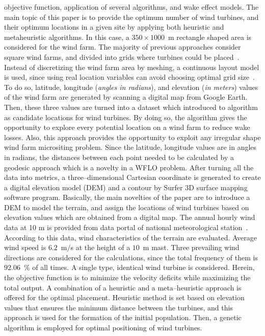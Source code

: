 \documentclass[]{iptconf}
\begin{document}
objective function, application of several algorithms, and wake effect models.
The main topic of this paper is to provide the optimum number of wind turbines,
and their optimum locations in a given site by applying both heuristic and 
metaheuristic algorithms. In this case, a $350\times1000$~m rectangle shaped area is considered
for the wind farm. The majority of previous approaches consider square wind farms,
and divided into grids where turbines could be placed~\cite{Saavedra2011}. Instead of discretizing
the wind farm area by meshing, a continuous layout model is used, since using
real location variables can avoid choosing optimal grid size~\cite{Gu2013}. To do so, latitude,
longitude (\textit{angles in radians}), and elevation (\textit{in meters}) values of the wind farm are
generated by scanning a digital map from Google Earth. Then, these three values are
turned into a dataset which introduced to algorithm as candidate locations for wind
turbines. By doing so, the algorithm gives the opportunity to explore every potential
location on a wind farm to reduce wake losses. Also, this approach provides the
opportunity to exploit any irregular shape wind farm micrositing problem. Since the
latitude, longitude values are in angles in radians, the distances between each point
needed to be calculated by a geodesic approach which is a novelty in a WFLO
problem. After turning all the data into metrics, a three--dimensional Cartesian
coordinate is generated to create a digital elevation model (DEM) and a contour
by Surfer $3$D surface mapping software program. Basically, the main novelties of
the paper are to introduce a DEM to model the terrain, and assign the locations of
wind turbines based on elevation values which are obtained from a digital map.
The annual hourly wind data at 10 m is provided from data portal of national
meteorological station~\cite{Meteoroloji2016}. According to this data, wind characteristics of the
terrain are evaluated. Average wind speed is $6.2$~m$/$s at the height of a $10$~m mast.
Three prevailing wind directions are considered for the calculations, since the total
frequency of them is $92.06$~\% of all times. A single type, identical wind turbine is
considered. Herein, the objective function is to minimize the velocity deficits while
maximizing the total output. A combination of a heuristic and a meta--heuristic
approach is offered for the optimal placement. Heuristic method is set based on
elevation values that ensures the minimum distance between the turbines, and
this approach is used for the formation of the initial population. Then, a genetic
algorithm is employed for optimal positioning of wind turbines.
\end{document}
